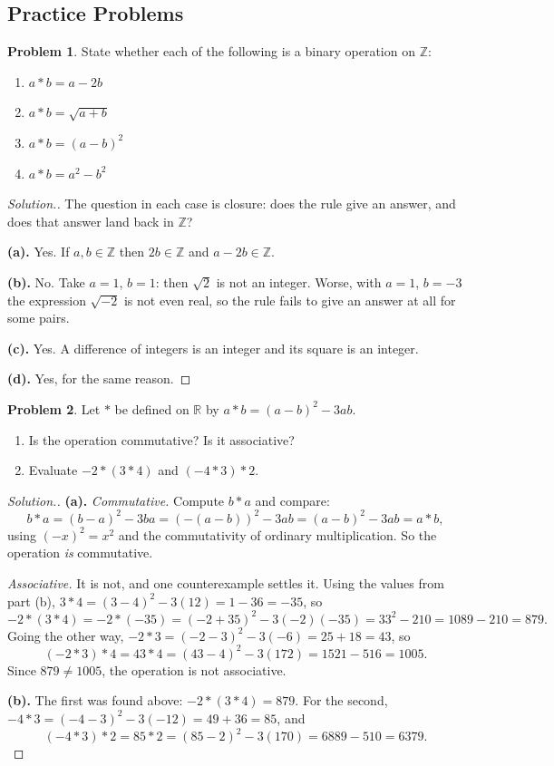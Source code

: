 \documentclass[11pt,a4paper]{article}
\theoremstyle{definition}
\newtheorem{problemx}{Problem}[section]
\newenvironment{problem}{\begin{problemx}}{\end{problemx}}
\newenvironment{solution}
  {\renewcommand{\qedsymbol}{}\begin{proof}[\textit{Solution}.]}
  {\end{proof}}
\begin{document}
\subsection{Practice Problems}

\begin{problem}
State whether each of the following is a binary operation on $\mathbb{Z}$:
\begin{enumerate}
\item[(a).] $a*b=a-2b$
\item[(b).] $a*b=\sqrt{a+b}$
\item[(c).] $a*b=(a-b)^{2}$
\item[(d).] $a*b=a^{2}-b^{2}$
\end{enumerate}
\end{problem}

\begin{solution}
The question in each case is closure: does the rule give an answer, and does that
answer land back in $\mathbb{Z}$?

\textbf{(a).} Yes. If $a,b\in\mathbb{Z}$ then $2b\in\mathbb{Z}$ and
$a-2b\in\mathbb{Z}$.

\textbf{(b).} No. Take $a=1$, $b=1$: then $\sqrt{2}$ is not an integer. Worse, with
$a=1$, $b=-3$ the expression $\sqrt{-2}$ is not even real, so the rule fails to
give an answer at all for some pairs.

\textbf{(c).} Yes. A difference of integers is an integer and its square is an
integer.

\textbf{(d).} Yes, for the same reason.
\end{solution}

\begin{problem}
Let $*$ be defined on $\mathbb{R}$ by $a*b=(a-b)^{2}-3ab$.
\begin{enumerate}
\item[(a).] Is the operation commutative? Is it associative?
\item[(b).] Evaluate $-2*(3*4)$ and $(-4*3)*2$.
\end{enumerate}
\end{problem}

\begin{solution}
\textbf{(a).} \emph{Commutative.} Compute $b*a$ and compare:
$$b*a=(b-a)^{2}-3ba=\left(-(a-b)\right)^{2}-3ab=(a-b)^{2}-3ab=a*b,$$
using $(-x)^{2}=x^{2}$ and the commutativity of ordinary multiplication. So the
operation \emph{is} commutative.

\emph{Associative.} It is not, and one counterexample settles it. Using the values
from part (b), $3*4=(3-4)^{2}-3(12)=1-36=-35$, so
$$-2*(3*4)=-2*(-35)=(-2+35)^{2}-3(-2)(-35)=33^{2}-210=1089-210=879 .$$
Going the other way, $-2*3=(-2-3)^{2}-3(-6)=25+18=43$, so
$$(-2*3)*4=43*4=(43-4)^{2}-3(172)=1521-516=1005 .$$
Since $879\neq 1005$, the operation is not associative.

\textbf{(b).} The first was found above: $-2*(3*4)=879$. For the second,
$-4*3=(-4-3)^{2}-3(-12)=49+36=85$, and
$$(-4*3)*2=85*2=(85-2)^{2}-3(170)=6889-510=6379 .$$
\end{solution}
\end{document}
